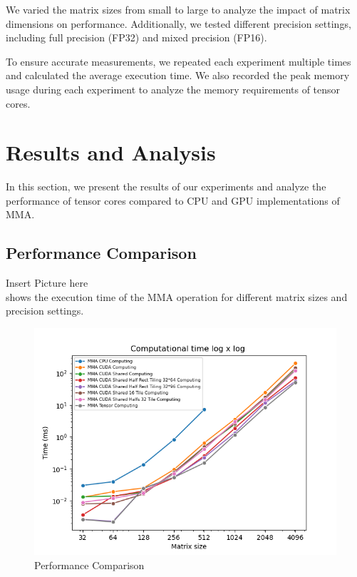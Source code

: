 \documentclass[conference]{IEEEtran}
\begin{document}
  We varied the matrix sizes from small to large to analyze the impact of matrix dimensions on 
  performance. Additionally, we tested different precision settings, including full precision (FP32)
  and mixed precision (FP16).
  
  To ensure accurate measurements, we repeated each experiment multiple times and calculated 
  the average execution time. We also recorded the peak memory usage during each experiment to 
  analyze the memory requirements of tensor cores.
  
  \section{Results and Analysis}\label{sec:results-analysis}
  
  In this section, we present the results of our experiments and analyze the performance of 
  tensor cores compared to CPU and GPU implementations of MMA.

  
  \subsection{Performance Comparison}\label{sec:performance-comparison}

  Insert Picture here\\
  shows the execution time of the MMA operation for different matrix sizes and precision settings.
  
  \begin{figure}[htbp]
    \centering
    \includegraphics[scale=0.5]{figures/Comp_time.png}
    \caption{Performance Comparison}
    \label{fig:performance-comparison}
  \end{figure}
\end{document}
